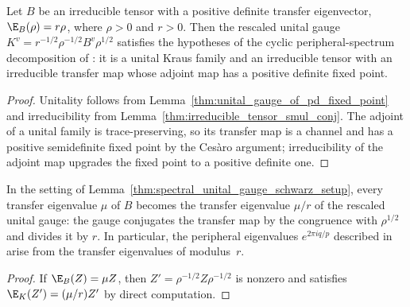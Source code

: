 \begin{lemma}
    \label{thm:spectral_unital_gauge_schwarz_setup}
    \leanok
    Let $B$ be an irreducible tensor with a positive definite transfer
    eigenvector, $\E_B(\rho)=r\rho$, where $\rho>0$ and $r>0$. Then the
    rescaled unital gauge
    $K^v=r^{-1/2}\rho^{-1/2}B^v\rho^{1/2}$ satisfies the hypotheses of the
    cyclic peripheral-spectrum decomposition of
    \cite[Theorem~6.6]{Wolf2012Quantum}: it is a unital Kraus family and an
    irreducible tensor with an irreducible transfer map whose adjoint map has a
    positive definite fixed point.
\end{lemma}

\begin{proof}
    \leanok
    Unitality follows from Lemma~\ref{thm:unital_gauge_of_pd_fixed_point} and
    irreducibility from Lemma~\ref{thm:irreducible_tensor_smul_conj}. The
    adjoint of a unital family is trace-preserving, so its transfer map is
    a channel and has a positive semidefinite fixed point by the Ces\`aro
    argument; irreducibility of the adjoint map upgrades the fixed point to
    a positive definite one.
\end{proof}

\begin{lemma}
    \label{lem:eigenvalue_transport_unital_gauge}
    \leanok
    In the setting of
    Lemma~\ref{thm:spectral_unital_gauge_schwarz_setup}, every transfer
    eigenvalue $\mu$ of $B$ becomes the transfer eigenvalue $\mu/r$ of the
    rescaled unital gauge: the gauge conjugates the transfer map by the
    congruence with $\rho^{1/2}$ and divides it by $r$. In particular, the
    peripheral eigenvalues $e^{2\pi iq/p}$ described in
    \cite[Section~2.3]{Cirac2016MPDO_arXiv} arise from the transfer eigenvalues
    of modulus~$r$.
\end{lemma}

\begin{proof}
    \leanok
    If $\E_B(Z)=\mu Z$, then
    $Z'=\rho^{-1/2}Z\rho^{-1/2}$ is nonzero and satisfies
    $\E_K(Z')=(\mu/r)Z'$ by direct computation.
\end{proof}
